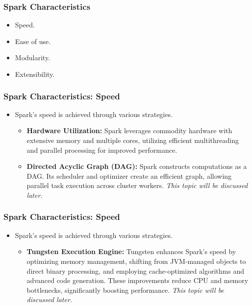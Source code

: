 \begin{frame}
    \frametitle{Spark Characteristics}
    \begin{itemize}
        \item Speed. 
        \item Ease of use. 
        \item Modularity. 
        \item Extensibility. 
    \end{itemize}
\end{frame}


\begin{frame}
    \frametitle{Spark Characteristics: Speed}
    \begin{itemize}
        \item Spark's speed is achieved through various strategies. 
        \begin{itemize}
            \item \textbf{Hardware Utilization:} Spark leverages commodity hardware with extensive memory and multiple cores, utilizing efficient multithreading and parallel processing for improved performance. 
            \item \textbf{Directed Acyclic Graph (DAG):} Spark constructs computations as a DAG. Its scheduler and optimizer create an efficient graph, allowing parallel task execution across cluster workers. \textit{\color{blue}This topic will be discussed later.} 
        \end{itemize}
    \end{itemize}

\end{frame}

\begin{frame}
    \frametitle{Spark Characteristics: Speed}
    \begin{itemize}
        \item Spark's speed is achieved through various strategies. 
        \begin{itemize}
            \item \textbf{Tungsten Execution Engine:} Tungsten enhances Spark's speed by optimizing memory management,
            shifting from JVM-managed objects to direct binary processing, and employing cache-optimized algorithms and advanced code generation. These improvements reduce CPU and memory bottlenecks, significantly boosting performance. \textit{\color{blue}This topic will be discussed later.} 
        \end{itemize}
    \end{itemize}

\end{frame}

